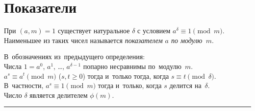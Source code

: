 
\section*{Показатели}


При $(a, m) = 1$ существует натуральное $\delta$ с условием
\(
    a^{\delta} \equiv 1 \pmod{m}
\).
Наименьшее из таких чисел называется \emph{показателем $a$ по модулю~$m$}.

\begin{problems}

\item
В~обозначениях из~предыдущего определения:
\\
\sp
Числа $1 = a^0$, $a^1$, \ldots, $a^{\delta-1}$ попарно несравнимы
по~модулю~$m$.
\\
\sp
$a^s \equiv a^t \pmod{m}$ ($s, t \geq 0$)
тогда и~только тогда, когда
$s \equiv t \pmod{\delta}$.
В~частности, $a^s \equiv 1 \pmod{m}$
тогда и~только, когда
$s$ делится на~$\delta$.
\\
\sp
Число $\delta$ является делителем $\phi(m)$.

\end{problems}

\medskip
\hrule

